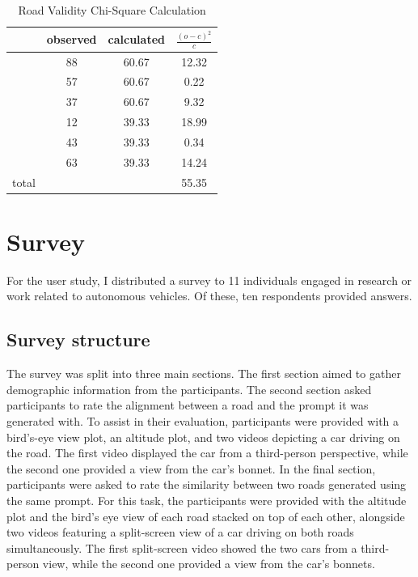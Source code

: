 \begin{table}[H]
    \centering
    \begin{tabular}{|c|c|c|c|} \hline 
         &  observed&  calculated& \(\frac{(o-c)^2}{c}\) \\ \hline 
         &  88&  60.67& 12.32\\ \hline 
         &  57&  60.67& 0.22\\ \hline 
         &  37&  60.67& 9.32\\ \hline 
         &  12&  39.33& 18.99\\ \hline 
         &  43&  39.33& 0.34\\ \hline 
         &  63&  39.33& 14.24\\ \hline 
         total&  &  & 55.35\\ \hline
    \end{tabular}
    \caption{Road Validity Chi-Square Calculation}
    \label{chi_sq_validity}
\end{table}

\section{Survey}
For the user study, I distributed a survey to 11 individuals engaged in research or work related to autonomous vehicles. Of these, ten respondents provided answers.

\subsection{Survey structure}
The survey was split into three main sections. The first section aimed to gather demographic information from the participants. The second section asked participants to rate the alignment between a road and the prompt it was generated with. To assist in their evaluation, participants were provided with a bird's-eye view plot, an altitude plot, and two videos depicting a car driving on the road. The first video displayed the car from a third-person perspective, while the second one provided a view from the car's bonnet. In the final section, participants were asked to rate the similarity between two roads generated using the same prompt. For this task, the participants were provided with the altitude plot and the bird's eye view of each road stacked on top of each other, alongside two videos featuring a split-screen view of a car driving on both roads simultaneously. The first split-screen video showed the two cars from a third-person view, while the second one provided a view from the car's bonnets.

